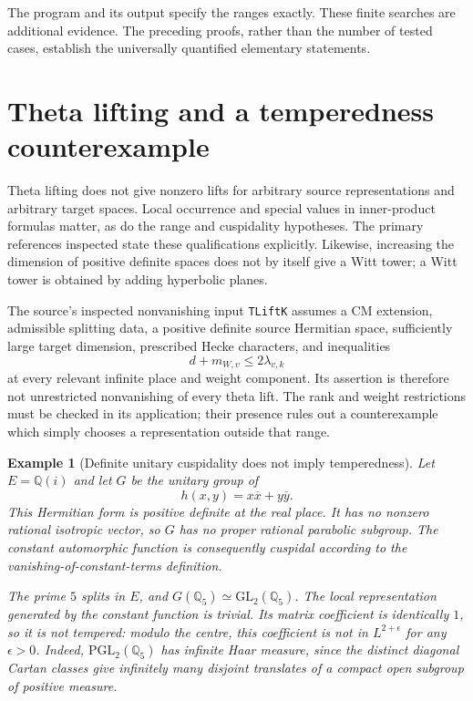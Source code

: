 \documentclass[11pt,a4paper]{article}
\newtheorem{example}[proposition]{Example}
\theoremstyle{remark}
\newcommand{\Q}{\mathbb Q}
\newcommand{\src}[1]{\cite{#1}}
\newcommand{\code}[1]{\texttt{#1}}
\begin{document}
The program and its output specify the ranges exactly. These finite searches are additional evidence. The preceding proofs, rather than the number of tested cases, establish the universally quantified elementary statements.

\section{Theta lifting and a temperedness counterexample}\label{sec:tempered}
Theta lifting does not give nonzero lifts for arbitrary source representations and arbitrary target spaces. Local occurrence and special values in inner-product formulas matter, as do the range and cuspidality hypotheses. The primary references inspected state these qualifications explicitly. Likewise, increasing the dimension of positive definite spaces does not by itself give a Witt tower; a Witt tower is obtained by adding hyperbolic planes. \src{gan-qiu-takeda,gan}

The source's inspected nonvanishing input \code{TLiftK} assumes a CM extension, admissible splitting data, a positive definite source Hermitian space, sufficiently large target dimension, prescribed Hecke characters, and inequalities
\[
 d+m_{W,v}\le2\lambda_{v,k}
\]
at every relevant infinite place and weight component. Its assertion is therefore not unrestricted nonvanishing of every theta lift. The rank and weight restrictions must be checked in its application; their presence rules out a counterexample which simply chooses a representation outside that range. \src{S-tlift}

\begin{example}[Definite unitary cuspidality does not imply temperedness]
Let $E=\Q(i)$ and let $G$ be the unitary group of
\[
 h(x,y)=x\overline{x}+y\overline{y}.
\]
This Hermitian form is positive definite at the real place. It has no nonzero rational isotropic vector, so $G$ has no proper rational parabolic subgroup. The constant automorphic function is consequently cuspidal according to the vanishing-of-constant-terms definition.

The prime $5$ splits in $E$, and $G(\Q_5)\simeq\mathrm{GL}_2(\Q_5)$. The local representation generated by the constant function is trivial. Its matrix coefficient is identically $1$, so it is not tempered: modulo the centre, this coefficient is not in $L^{2+\epsilon}$ for any $\epsilon>0$. Indeed, $\mathrm{PGL}_2(\Q_5)$ has infinite Haar measure, since the distinct diagonal Cartan classes give infinitely many disjoint translates of a compact open subgroup of positive measure.
\end{example}
\end{document}
